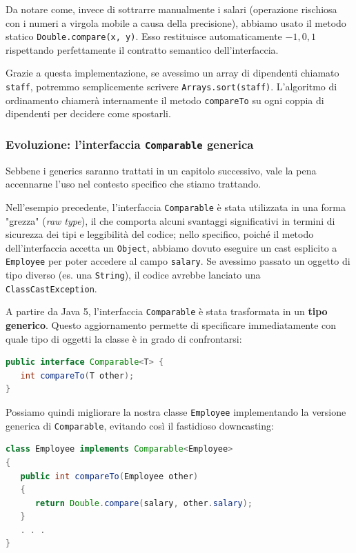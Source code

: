 Da notare come, invece di sottrarre manualmente i salari (operazione rischiosa con i numeri a virgola mobile a causa della precisione), abbiamo usato il metodo statico \texttt{Double.compare(x, y)}. Esso restituisce automaticamente $-1, 0, 1$ rispettando perfettamente il contratto semantico dell'interfaccia.

Grazie a questa implementazione, se avessimo un array di dipendenti chiamato \texttt{staff}, potremmo semplicemente scrivere \texttt{Arrays.sort(staff)}. L'algoritmo di ordinamento chiamerà internamente il metodo \texttt{compareTo} su ogni coppia di dipendenti per decidere come spostarli.


\subsubsection*{Evoluzione: l'interfaccia \texttt{Comparable} generica}
Sebbene i generics saranno trattati in un capitolo successivo, vale la pena accennarne l'uso nel contesto specifico che stiamo trattando.

Nell'esempio precedente, l'interfaccia \texttt{Comparable} è stata utilizzata in una forma "grezza" (\textit{raw type}), il che comporta alcuni svantaggi significativi in termini di sicurezza dei tipi e leggibilità del codice; nello specifico, poiché il metodo dell'interfaccia accetta un \texttt{Object}, abbiamo dovuto eseguire un cast esplicito a \texttt{Employee} per poter accedere al campo \texttt{salary}. Se avessimo passato un oggetto di tipo diverso (es. una \texttt{String}), il codice avrebbe lanciato una \texttt{ClassCastException}.

A partire da Java 5, l'interfaccia \texttt{Comparable} è stata trasformata in un \textbf{tipo generico}. Questo aggiornamento permette di specificare immediatamente con quale tipo di oggetti la classe è in grado di confrontarsi:

\begin{lstlisting}[language=Java]
public interface Comparable<T> {
   int compareTo(T other);
}
\end{lstlisting}

Possiamo quindi migliorare la nostra classe \texttt{Employee} implementando la versione generica di \texttt{Comparable}, evitando così il fastidioso downcasting:

\begin{lstlisting}[language=Java]
class Employee implements Comparable<Employee>
{
   public int compareTo(Employee other)
   {
      return Double.compare(salary, other.salary);
   }
   . . .
}
\end{lstlisting}

